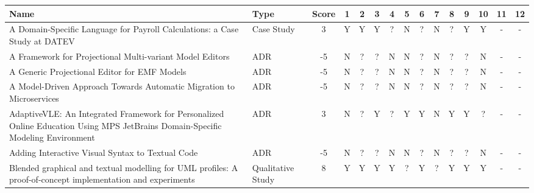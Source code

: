 \begin{landscape}
    \begin{longtable}{ | p{11cm} | l | *{13}{c|} }
        \hline\hline
        Name                                                                                                                                                                   & Type              & Score & 1 & 2 & 3 & 4 & 5 & 6 & 7 & 8 & 9 & 10 & 11 & 12 \\
        \hline
        \endhead  %
        \hline\endfoot  %
        A Domain-Specific Language for Payroll Calculations: a Case Study at DATEV\cite{voelterdomain_SLR}                                                                     & Case Study        &  3    & Y & Y & Y & ? & N & ? & N & ? & Y & Y  & - & - \\\hline
        A Framework for Projectional Multi-variant Model Editors\cite{schropfer2021framework_SLR}                                                                              & ADR               &  -5   & N & ? & ? & N & N & ? & N & ? & ? & N  & - & - \\\hline
        A Generic Projectional Editor for EMF Models\cite{schropfer2020generic_SLR}                                                                                            & ADR               &  -5   & N & ? & ? & N & N & ? & N & ? & ? & N  & - & - \\\hline
        A Model-Driven Approach Towards Automatic Migration to Microservices\cite{bucchiarone2019model_SLR}                                                                    & ADR               &  -5   & N & ? & ? & N & N & ? & N & ? & ? & N  & - & - \\\hline
        AdaptiveVLE: An Integrated Framework for Personalized Online Education Using MPS JetBrains Domain-Specific Modeling Environment\cite{meacham2020adaptivevle_SLR}       & ADR               &  3    & N & ? & Y & ? & Y & Y & N & Y & Y & ?  & - & - \\\hline
        Adding Interactive Visual Syntax to Textual Code\cite{andersen2020adding_SLR}                                                                                          & ADR               &  -5   & N & ? & ? & N & N & ? & N & ? & ? & N  & - & - \\\hline
        Blended graphical and textual modelling for UML profiles: A proof-of-concept implementation and experiments\cite{addazi2021blended_SLR}                                & Qualitative Study &  8    & Y & Y & Y & Y & ? & Y & ? & Y & Y & Y  & - & - \\\hline

\end{longtable}
\end{landscape}
